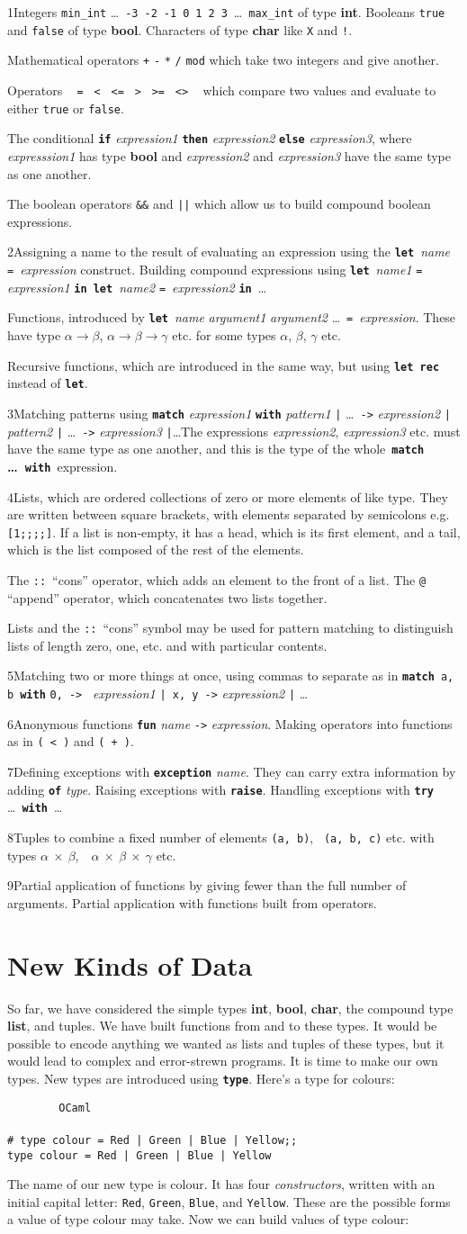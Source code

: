 \documentclass[]{book}
\makeatletter
\newcommand\upquote[1]{\textquotesingle#1\textquotesingle}
\newcommand{\sofarstartingoff}{

\noindent \lettrine[loversize=0.1,nindent=0em]{1}{}Integers \texttt{min\_int} \ldots\ \texttt{-3}\ \texttt{-2}\ \texttt{-1}\ \texttt{0}\ \texttt{1}\ \texttt{2}\ \texttt{3}\ \ldots\ \texttt{max\_int} of type \textbf{\textsf{int}}. Booleans \texttt{true} and \texttt{false} of type \textbf{\textsf{bool}}. \noindent Characters of type \textsf{\textbf{char}} like \texttt{\upquote{X}} and \texttt{\upquote{!}}.
\vspace{2mm}

\noindent Mathematical operators \texttt{+} \texttt{-} \texttt{*} \texttt{/} \texttt{mod} which take two integers and give another.

\vspace{2mm}

\noindent Operators \ \!\! \texttt{=\ \!\!} \texttt{<\ \!\!} \texttt{<=\ \!\!} \texttt{>\ \!\!} \texttt{>=\ \!\!} \texttt{<>} \ \!\! which compare two values and evaluate to either \texttt{true} or \texttt{false}.

\vspace{2mm}

\noindent The conditional \textbf{\texttt{if}} \textit{expression1} \textbf{\texttt{then}} \textit{expression2} \textbf{\texttt{else}} \textit{expression3}, where \textit{expresssion1} has type \textsf{\textbf{bool}} and \textit{expression2} and \textit{expression3} have the same type as one another.

\vspace{2mm}

\noindent The boolean operators \texttt{\&\&} and \texttt{||} which allow us to build compound boolean expressions.}
\newcommand{\sofarfunctions}
{
\noindent\lettrine[loversize=0.1,findent=2pt,nindent=0em]{2}{}Assigning a name to the result of evaluating an expression using the \textbf{\texttt{let}}\ \textit{name} \texttt{=}\ \textit{expression} construct. Building compound expressions using \textbf{\texttt{let}}\ \textit{name1} \texttt{=} \textit{expression1} \textbf{\texttt{in}}\ \textbf{\texttt{let}}\ \textit{name2} \texttt{=}\ \textit{expression2} \textbf{\texttt{in}}\ \ldots

\vspace{2mm} 

\noindent Functions, introduced by \textbf{\texttt{let}}\ \textit{name} \textit{argument1} \textit{argument2} \ldots\ \texttt{=}\ \textit{expression}. These have type $\alpha \rightarrow \beta$, $\alpha \rightarrow \beta \rightarrow \gamma$ etc. for some types $\alpha$, $\beta$, $\gamma$ etc.

\vspace{2mm}

\noindent Recursive functions, which are introduced in the same way, but using \textbf{\texttt{let\!\! rec}} instead of \textbf{\texttt{let}}.}
\newcommand{\sofarcasebycase}
{\noindent \lettrine[loversize=0.1,findent=2pt,nindent=0em]{3}{}Matching patterns using \textbf{\texttt{match}} \textit{expression1} \textbf{\texttt{with}} \textit{pattern1} \texttt{|} \ldots\ \texttt{->} \textit{expression2} \texttt{|} \textit{pattern2} \texttt{|} \ldots\ \texttt{->} \textit{expression3} \texttt{|}\ldots The expressions \textit{expression2}, \textit{expression3} etc. must have the same type as one another, and this is the type of the whole \,\textbf{\texttt{match} \ldots\ \texttt{with}}\, expression.}
\newcommand{\sofarlistingthings}
{
\noindent \lettrine[loversize=0.1,findent=2pt,nindent=0em]{4}{}Lists, which are ordered collections of zero or more elements of like type. They are written between square brackets, with elements separated by semicolons e.g. \texttt{[1;\! 2;\! 3;\! 4;\! 5]}. If a list is non-empty, it has a head, which is its first element, and a tail, which is the list composed of the rest of the elements.

\vspace{2mm}

\noindent The \texttt{::}\ ``cons'' operator, which adds an element to the front of a list. The \texttt{@} ``append'' operator, which concatenates two lists together.

\vspace{2mm}

\noindent Lists and the \texttt{::}\ ``cons'' symbol may be used for pattern matching to distinguish lists of length zero, one, etc. and with particular contents.}
\newcommand{\sofarsortingthings}
{
\noindent \lettrine[loversize=0.1,findent=2pt,nindent=0em]{5}{}Matching two or more things at once, using commas to separate as in \texttt{\textbf{match}}\, \texttt{a,\!\! b}\, \textbf{\texttt{with}} \texttt{0,\!\! 0\! ->\! }\! \textit{expression1} \texttt{|\ \!x,\!\! y\! ->} \textit{expression2} \texttt{|} \ldots
}
\newcommand{\sofarfunctionsuponfunctions}
{
\noindent \lettrine[loversize=0.1,findent=2pt,nindent=0em]{6}{}Anonymous functions \textbf{\texttt{fun}} \textit{name} \texttt{->} \textit{expression}. Making operators into functions as in \texttt{(\! <\! )} and \texttt{(\! +\! )}.
}
\newcommand{\sofarwhenthingsgowrong}
{
\noindent \lettrine[loversize=0.1,findent=2pt,nindent=0em]{7}{}Defining exceptions with \textbf{\texttt{exception}} \textit{name}. They can carry extra information by adding \textbf{\texttt{of}} \textit{type}. Raising exceptions with \textbf{\texttt{raise}}. Handling exceptions with \textbf{\texttt{try}} \ldots\ \textbf{\texttt{with}}\ \ldots}
\newcommand{\sofarlookingthingsup}
{
\noindent \lettrine[loversize=0.1,findent=2pt,nindent=0em]{8}{}Tuples to combine a fixed number of elements \texttt{(a,\! b)},\!    \ \texttt{(a,\! b,\! c)} etc. with types \textsf{\textbf{$\alpha$ $\times$ $\beta$}},\ \  \textsf{\textbf{$\alpha$ $\times$ $\beta$ $\times$ $\gamma$}} etc.
}
\newcommand{\sofarmorewithfunctions}
{
\noindent \lettrine[loversize=0.1,findent=2pt,nindent=0em]{9}{}Partial application of functions by giving fewer than the full number of arguments. Partial application with functions built from operators.
}
\newcommand{\smspace}{\vspace{4mm}}
\makeatother
\begin{document}
\begin{multicols*}{2}
\footnotesize
\sofarstartingoff

\vspace{\baselineskip}
\sofarfunctions

\vspace{\baselineskip}
\sofarcasebycase

\vspace{\baselineskip}
\sofarlistingthings

\vspace{\baselineskip}
\sofarsortingthings

\vspace{\baselineskip}
\sofarfunctionsuponfunctions

\vspace{\baselineskip}
\sofarwhenthingsgowrong

\vspace{\baselineskip}
\sofarlookingthingsup

\vspace{\baselineskip}
\sofarmorewithfunctions

\end{multicols*}

\pagestyle{empty}


\chapter{New Kinds of Data}
\pagestyle{fancy}
\label{newkindsofdata}

So far, we have considered the simple types \textbf{\textsf{int}}, \textbf{\textsf{bool}}, \textbf{\textsf{char}}, the compound type \textbf{\textsf{list}}, and tuples. We have built functions from and to these types. It would be possible to encode anything we wanted as lists and tuples of these types, but it would lead to complex and error-strewn programs. It is time to make our own types. New types are introduced using \texttt{\textbf{type}}. Here's a type for colours:

\smspace
\noindent\verb!        OCaml!\\
\noindent\\
\noindent\verb!# type colour = Red | Green | Blue | Yellow;;!\\
\noindent\verb!type colour = Red | Green | Blue | Yellow!
\smspace

\noindent The name of our new type is \textsf{colour}. It has four \textit{constructors}, written with an initial capital letter: \texttt{Red}, \texttt{Green}, \texttt{Blue}, and \texttt{Yellow}. These are the possible forms a value of type \textsf{colour} may take. Now we can build values of type \textsf{colour}:
\end{document}
